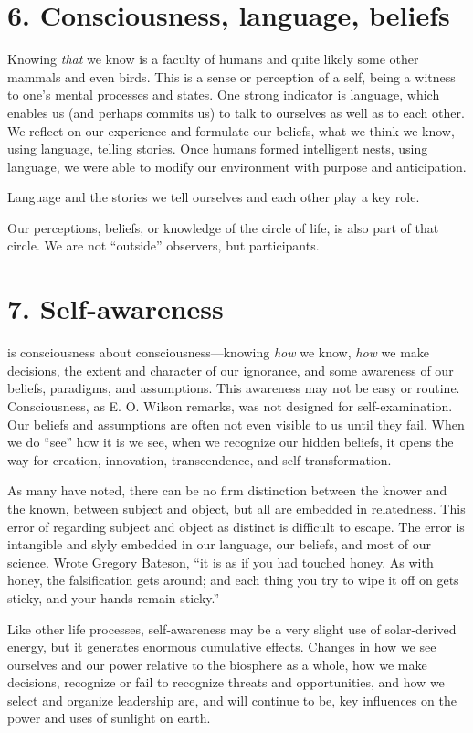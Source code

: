 \documentclass[11pt,letterpaper,twoside,onecolumn]{memoir}
\begin{document}
\section*{6. Consciousness, language, beliefs}

Knowing \textit{that} we know is a faculty of humans and quite likely some other mammals and even birds.  This is a sense or perception of a self, being a witness to one's mental processes and states. One strong indicator is language, which enables us (and perhaps commits us) to talk to ourselves as well as to each other. We reflect on our experience and formulate our beliefs, what we think we know, using language, telling stories. Once humans formed intelligent nests, using language, we were able to modify our environment with purpose and anticipation. 

Language and the stories we tell ourselves and each other play a key role.

Our perceptions, beliefs, or knowledge of the circle of life, is also part of that circle. We are not ``outside'' observers, but participants.


\section*{7. Self-awareness}

is consciousness about consciousness---knowing \textit{how} we know, \textit{how} we make decisions, the extent and character of our ignorance, and some awareness of our beliefs, paradigms, and assumptions. This awareness may not be easy or routine. Consciousness, as E. O. Wilson remarks, was not designed for self-examination. Our beliefs and assumptions are often not even visible to us until they fail. When we do ``see'' how it is we see, when we recognize our hidden beliefs, it opens the way for creation, innovation, transcendence, and self-transformation.

As many have noted, there can be no firm distinction between the knower and the known, between subject and object, but all are embedded in relatedness. This error of regarding subject and object as distinct is difficult to escape. The error is intangible and slyly embedded in our language, our beliefs, and most of our science.  Wrote Gregory Bateson, ``it is as if you had touched honey. As with honey, the falsification gets around; and each thing you try to wipe it off on gets sticky, and your hands remain sticky.''

Like other life processes, self-awareness may be a very slight use of solar-derived energy, but it generates enormous cumulative effects. Changes in how we see ourselves and our power relative to the biosphere as a whole, how we make decisions, recognize or fail to recognize threats and opportunities, and how we select and organize leadership are, and will continue to be, key influences on the power and uses of sunlight on earth.
\end{document}
